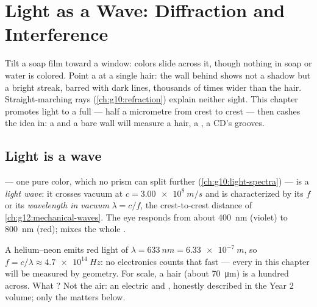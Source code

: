 \chapter{Light as a Wave: Diffraction and Interference}\label{ch:g12:light-as-wave}

Tilt a soap film toward a window: colors slide across it, though
nothing in soap or water is colored. Point a  at a single hair:
the wall behind shows not a  shadow but a bright streak,
barred with dark lines, thousands of times wider than the hair.
Straight-marching rays (\cref{ch:g10:refraction}) explain neither
sight. This chapter promotes light to a full  --- half a
micrometre from crest to crest --- then cashes the idea in: a 
and a bare wall will measure a hair, a , a CD's grooves.

\section{Light is a wave}

\begin{definition}\label{def:g12:light-as-wave:lightwave}
 --- one pure color, which no prism can split
further (\cref{ch:g10:light-spectra}) --- is a  \emph{light
wave}: it crosses vacuum at $c = \qty{3.00e8}{m/s}$
and is characterized by its  $f$ or its \emph{wavelength in
vacuum} $\lambda = c/f$, the
crest-to-crest distance of \cref{ch:g12:mechanical-waves}. The eye
responds from about \qty{400}{nm} (violet) to \qty{800}{nm} (red);
 mixes the whole .
\end{definition}

\begin{example}\label{ex:g12:light-as-wave:orders}
A helium--neon  emits red light of $\lambda = \qty{633}{nm} =
\qty{6.33e-7}{m}$, so $f = c/\lambda \approx \qty{4.7e14}{Hz}$: no
electronics counts that fast --- every  in this chapter will
be measured by geometry. For scale, a hair (about \qty{70}{\micro m})
is a hundred  across. What ? Not the air: an electric
and , honestly described in the Year 2 volume; only the
 matters below.
\end{example}

